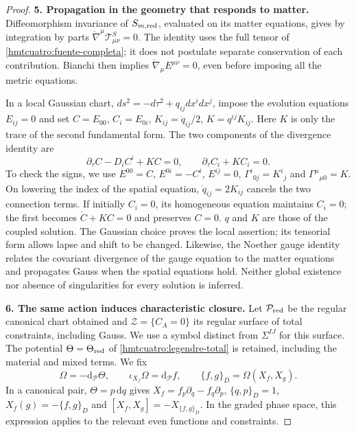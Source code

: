 \begin{proof}
\par\medskip\noindent\textbf{5. Propagation in the geometry that responds to matter.}\quad
Diffeomorphism invariance of \(S_{m,\rm red}\), evaluated on its matter equations, gives by integration by parts \(\mathring\nabla^\mu\mathcal T^S_{\mu\nu}=0\). The identity uses the full tensor of \eqref{hmtcuatro:fuente-completa}; it does not postulate separate conservation of each contribution. Bianchi then implies \(\mathring\nabla_\mu E^{\mu\nu}=0\), even before imposing all the metric equations.

In a local Gaussian chart, \(ds^2=-d\tau^2+q_{ij}dx^idx^j\), impose the evolution equations \(E_{ij}=0\) and set \(C=E_{00}\), \(C_i=E_{0i}\), \(K_{ij}=\dot q_{ij}/2\), \(K=q^{ij}K_{ij}\). Here \(K\) is only the trace of the second fundamental form. The two components of the divergence identity are
\begin{equation}
 \partial_\tau C-D_iC^i+KC=0,\qquad
 \partial_\tau C_i+KC_i=0.
 \label{hmtcuatro:propagacion}
\end{equation}
To check the signs, we use \(E^{00}=C\), \(E^{0i}=-C^i\), \(E^{ij}=0\), \(\Gamma^i{}_{0j}=K^i{}_j\) and \(\Gamma^\mu{}_{\mu0}=K\). On lowering the index of the spatial equation, \(\dot q_{ij}=2K_{ij}\) cancels the two connection terms. If initially \(C_i=0\), its homogeneous equation maintains \(C_i=0\); the first becomes \(\dot C+KC=0\) and preserves \(C=0\). \(q\) and \(K\) are those of the coupled solution. The Gaussian choice proves the local assertion; its tensorial form allows lapse and shift to be changed. Likewise, the Noether gauge identity relates the covariant divergence of the gauge equation to the matter equations and propagates Gauss when the spatial equations hold. Neither global existence nor absence of singularities for every solution is inferred.

\par\medskip\noindent\textbf{6. The same action induces characteristic closure.}\quad
Let \(\mathcal P_{\rm red}\) be the regular canonical chart obtained and \(\mathcal Z=\{C_A=0\}\) its regular surface of total constraints, including Gauss. We use a symbol distinct from \(\Sigma^{IJ}\) for this surface. The potential \(\Theta=\Theta_{\rm red}\) of \eqref{hmtcuatro:legendre-total} is retained, including the material and mixed terms. We fix
\begin{equation}
 \Omega=-\mathrm d_{\mathcal P}\Theta,\qquad
 \iota_{X_f}\Omega=\mathrm d_{\mathcal P}f,\qquad
 \{f,g\}_D=\Omega(X_f,X_g).
 \label{hmtcuatro:convenciones-simpecticas}
\end{equation}
In a canonical pair, \(\Theta=p\,\mathrm dq\) gives \(X_f=f_p\partial_q-f_q\partial_p\), \(\{q,p\}_D=1\), \(X_f(g)=-\{f,g\}_D\) and \([X_f,X_g]=-X_{\{f,g\}_D}\). In the graded phase space, this expression applies to the relevant even functions and constraints.


\end{proof}

